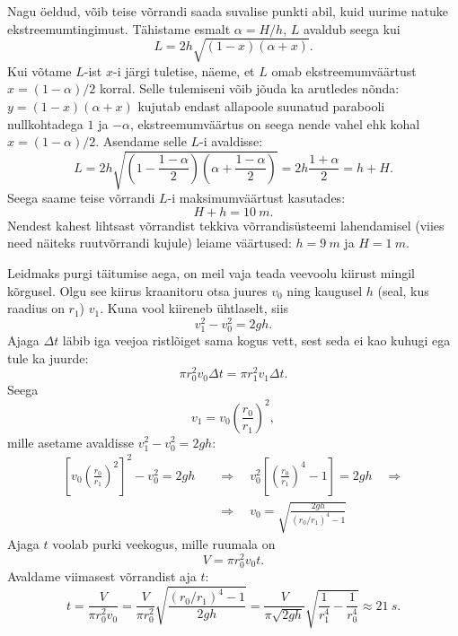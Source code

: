 \documentclass[10pt]{article}
\begin{document}
{Nagu öeldud, võib teise võrrandi saada suvalise punkti abil, kuid uurime natuke ekstreemumtingimust. Tähistame esmalt $\alpha = H/h$, $L$ avaldub seega kui
\[
L=2 h \sqrt{(1-x)(\alpha+x)}.
\]
Kui võtame $L$-ist $x$-i järgi tuletise, näeme, et $L$ omab ekstreemumväärtust $x = (1 - \alpha )/2$ korral. Selle tulemiseni võib jõuda ka arutledes nõnda: $y = (1-x)(\alpha +x)$ kujutab endast allapoole suunatud parabooli nullkohtadega $1$ ja $-\alpha$, ekstreemumväärtus on seega nende vahel ehk kohal $x = (1 - \alpha )/2$. Asendame selle $L$-i avaldisse:
\[
L=2 h \sqrt{\left(1-\frac{1-\alpha}{2}\right)\left(\alpha+\frac{1-\alpha}{2}\right)}=2 h \frac{1+\alpha}{2}=h+H.
\]
Seega saame teise võrrandi $L$-i maksimumväärtust kasutades:
\[
H + h = \SI{10}{m}.
\]
Nendest kahest lihtsast võrrandist tekkiva võrrandisüsteemi lahendamisel (viies need näiteks ruutvõrrandi kujule) leiame väärtused: $h = \SI{9}{m}$ ja $H = \SI{1}{m}$.
\probend
\bigskip


\solu
Leidmaks purgi täitumise aega, on meil vaja teada veevoolu kiirust mingil kõrgusel. Olgu see kiirus kraanitoru otsa juures $v_0$ ning kaugusel $h$ (seal, kus raadius on $r_1$) $v_1$. Kuna vool kiireneb ühtlaselt, siis
\[
v_1^2 - v_0^2 = 2gh.
\]
Ajaga $\Delta t$ läbib iga veejoa ristlõiget sama kogus vett, sest seda ei kao kuhugi ega tule ka juurde:
\[
\pi r_0^2 v_0\Delta t = \pi r_1^2 v_1\Delta t.
\]
Seega
\[
v_1 = v_0 \left(\frac{r_0}{r_1}\right)^2,
\]
mille asetame avaldisse $v_1^2-v_0^2=2gh$:
\[
\begin{aligned}
\left[v_{0}\left(\frac{r_{0}}{r_{1}}\right)^{2}\right]^{2}-v_{0}^{2}=2 g h \quad&\Rightarrow\quad v_{0}^{2}\left[\left(\frac{r_{0}}{r_{1}}\right)^{4}-1\right]=2 g h \quad\Rightarrow\\
&\Rightarrow \quad v_{0}=\sqrt{\frac{2 g h}{\left(r_{0} / r_{1}\right)^{4}-1}}
\end{aligned}
\]
Ajaga $t$ voolab purki veekogus, mille ruumala on
\[
V = \pi r_0^2 v_0t.
\]
Avaldame viimasest võrrandist aja $t$:
\[
t=\frac{V}{\pi r_{0}^{2} v_{0}}=\frac{V}{\pi r_{0}^{2}} \sqrt{\frac{\left(r_{0} / r_{1}\right)^{4}-1}{2 g h}} = \frac{V}{\pi \sqrt{2 g h}} \sqrt{\frac{1}{r_{1}^{4}}-\frac{1}{r_{0}^{4}}}\approx \SI{21}{s}.
\]
\probend
\bigskip


}
\end{document}
